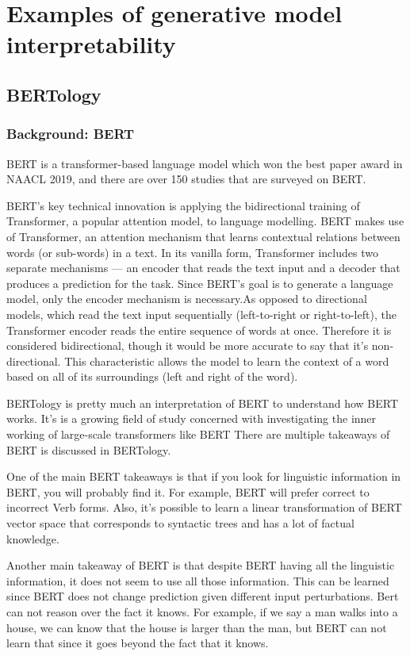 \documentclass[]{article}
\begin{document}
\section{Examples of generative model interpretability} 
\subsection{BERTology} 
\subsubsection{Background: BERT}
BERT\cite{b10} is a transformer-based language model which won the best paper award in NAACL 2019, and there are over 150 studies that are surveyed on BERT\cite{b11}.

BERT’s key technical innovation is applying the bidirectional training of Transformer, a popular attention model, to language modelling. BERT makes use of Transformer, an attention mechanism that learns contextual relations between words (or sub-words) in a text. In its vanilla form, Transformer includes two separate mechanisms — an encoder that reads the text input and a decoder that produces a prediction for the task. Since BERT’s goal is to generate a language model, only the encoder mechanism is necessary.As opposed to directional models, which read the text input sequentially (left-to-right or right-to-left), the Transformer encoder reads the entire sequence of words at once. Therefore it is considered bidirectional, though it would be more accurate to say that it’s non-directional. This characteristic allows the model to learn the context of a word based on all of its surroundings (left and right of the word).\cite{b11}

BERTology is pretty much an interpretation of BERT to understand how BERT works. It's is a growing field of study concerned with investigating the inner working of large-scale transformers like BERT\cite{b12} There are multiple takeaways of BERT is discussed in BERTology. 

One of the main BERT takeaways is that if you look for linguistic information in BERT, you will probably find it. For example, BERT will prefer correct to incorrect Verb forms. Also, it's possible to learn a linear transformation of BERT vector space that corresponds to syntactic trees and has a lot of factual knowledge. 

Another main takeaway of BERT is that despite BERT having all the linguistic information, it does not seem to use all those information. This can be learned since BERT does not change prediction given different input perturbations. Bert can not reason over the fact it knows. For example, if we say a man walks into a house, we can know that the house is larger than the man, but BERT can not learn that since it goes beyond the fact that it knows. 
\end{document}
